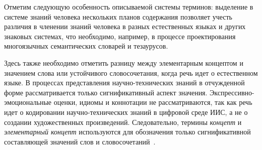 \begin{multicols}{2}
\begin{enumerate}[1.]
   Отметим следующую особенность описываемой системы терминов: выделение в системе
знаний человека нескольких планов содержания позволяет учесть различия в членении
знаний человека в разных естественных языках и других знаковых системах, что
необходимо, например, в процессе проектирования многоязычных семантических словарей и
тезаурусов.

  Здесь также необходимо отметить разницу %
  между элементарным концептом и значением
слова или устойчивого словосочетания, когда речь идет о естественном языке. В процессах %
представле\-ния научно-технических знаний в %
от\-чуж\-денной форме рассматривается только
сигнификативный аспект значения. Экс\-прес\-сив\-но-эмо\-цио\-наль\-ные оценки, идиомы и
коннотации не рассматриваются, так как речь идет о кодировании на\-уч\-но-тех\-ни\-че\-ских
зна\-ний в циф\-ро\-вой среде ИИС, а не о созда\-нии ху\-до\-жест\-вен\-ных произведений.
   Следова\-тельно, %
   термины \textit{концепт} и \textit{элементарный концепт} используются
для обозначения только сигнификативной составляющей значений слов и
словосочетаний~\cite{32za, 31za}.
{

}
\end{enumerate}
\end{multicols}
